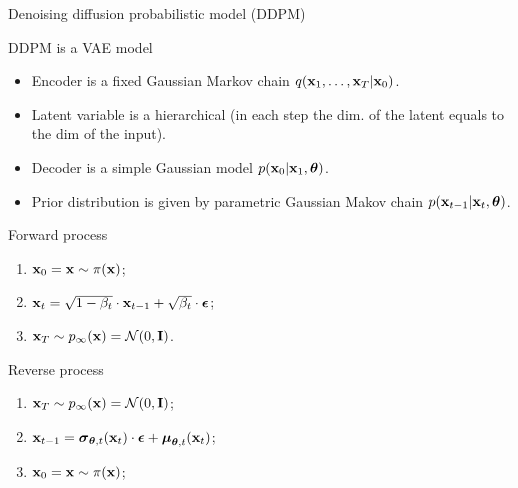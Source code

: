 \begin{frame}{Denoising diffusion probabilistic model (DDPM)}
	\begin{block}{DDPM is a VAE model}
		\begin{itemize}
			\item Encoder is a fixed Gaussian Markov chain $q(\mathbf{x}_1, \dots, \mathbf{x}_T | \mathbf{x}_0)$.
			\item Latent variable is a hierarchical (in each step the dim. of the latent equals to the dim of the input).
			\item Decoder is a simple Gaussian model $p(\mathbf{x}_0 | \mathbf{x}_1, \boldsymbol{\theta})$.
			\item Prior distribution is given by parametric Gaussian Makov chain $p(\mathbf{x}_{t-1} | \mathbf{x}_t, \boldsymbol{\theta})$.
		\end{itemize}
	\end{block}
	\begin{minipage}{0.5\linewidth}
		\begin{block}{Forward process}
			\begin{enumerate}
				\item $\mathbf{x}_0 = \mathbf{x} \sim \pi(\mathbf{x})$;
				\item $\mathbf{x}_t = \sqrt{1 - \beta_t} \cdot \mathbf{x}_{t - 1} + \sqrt{\beta_t} \cdot \boldsymbol{\epsilon}$;
				\item $\mathbf{x}_T \sim p_{\infty}(\mathbf{x}) = \mathcal{N}(0, \mathbf{I})$.
			\end{enumerate}
		\end{block}
	\end{minipage}%
	\begin{minipage}{0.55\linewidth}
		\begin{block}{Reverse process}
			\begin{enumerate}
				\item $\mathbf{x}_T \sim p_{\infty}(\mathbf{x}) = \mathcal{N}(0, \mathbf{I})$;
				\item $\mathbf{x}_{t - 1} = \boldsymbol{\sigma}_{\boldsymbol{\theta}, t}(\mathbf{x}_t) \cdot \boldsymbol{\epsilon} + \boldsymbol{\mu}_{\boldsymbol{\theta}, t}(\mathbf{x}_t)$;
				\item $\mathbf{x}_0 = \mathbf{x} \sim \pi(\mathbf{x})$;
			\end{enumerate}
		\end{block}
	\end{minipage}
\end{frame}
